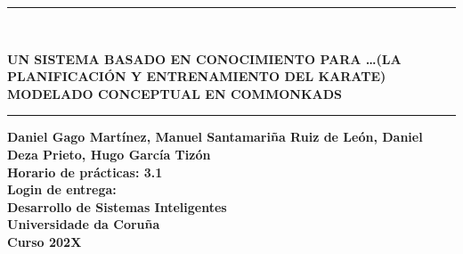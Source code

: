 \documentclass[12pt,a4paper,twoside,spanish]{article}      %
\begin{document}
\def\chaptername{Capítulo}
\def\tablename{Tabla}
\def\listtablename{Índice de Tablas}
\chapterfont{\LARGE\raggedleft}

\pagestyle{empty}

\begin{titlepage}
\setlength{\parindent}{0cm} \setlength{\parskip}{0cm}


\newcommand{\HRule}{\rule{\linewidth}{1mm}}

\vspace*{2cm}
\HRule \\[0.5cm]
\begin{center}
\textsf{\textbf{\large UN SISTEMA BASADO EN CONOCIMIENTO PARA \ldots(LA PLANIFICACIÓN Y ENTRENAMIENTO DEL KARATE)\\[0.75cm] MODELADO CONCEPTUAL EN COMMONKADS \\[0.5cm]}}
\HRule \vspace*{3cm}

\textsf{\textbf{\normalsize Daniel Gago Martínez, Manuel Santamariña Ruiz de León, Daniel Deza Prieto, Hugo García Tizón\\[5cm]
Horario de prácticas: 3.1\\
Login de entrega: \\[2.5cm]
Desarrollo de Sistemas Inteligentes\\
Universidade da Coruña \\ Curso
202X}}
\end{center}
\end{titlepage}

\cleardoublepage


\tableofcontents
\cleardoublepage


\end{document}
